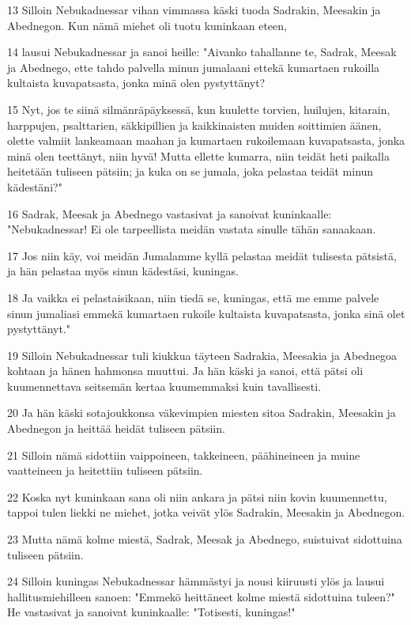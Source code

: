 \par 13 Silloin Nebukadnessar vihan vimmassa käski tuoda Sadrakin, Meesakin ja Abednegon. Kun nämä miehet oli tuotu kuninkaan eteen,
\par 14 lausui Nebukadnessar ja sanoi heille: "Aivanko tahallanne te, Sadrak, Meesak ja Abednego, ette tahdo palvella minun jumalaani ettekä kumartaen rukoilla kultaista kuvapatsasta, jonka minä olen pystyttänyt?
\par 15 Nyt, jos te siinä silmänräpäyksessä, kun kuulette torvien, huilujen, kitarain, harppujen, psalttarien, säkkipillien ja kaikkinaisten muiden soittimien äänen, olette valmiit lankeamaan maahan ja kumartaen rukoilemaan kuvapatsasta, jonka minä olen teettänyt, niin hyvä! Mutta ellette kumarra, niin teidät heti paikalla heitetään tuliseen pätsiin; ja kuka on se jumala, joka pelastaa teidät minun kädestäni?"
\par 16 Sadrak, Meesak ja Abednego vastasivat ja sanoivat kuninkaalle: "Nebukadnessar! Ei ole tarpeellista meidän vastata sinulle tähän sanaakaan.
\par 17 Jos niin käy, voi meidän Jumalamme kyllä pelastaa meidät tulisesta pätsistä, ja hän pelastaa myös sinun kädestäsi, kuningas.
\par 18 Ja vaikka ei pelastaisikaan, niin tiedä se, kuningas, että me emme palvele sinun jumaliasi emmekä kumartaen rukoile kultaista kuvapatsasta, jonka sinä olet pystyttänyt."
\par 19 Silloin Nebukadnessar tuli kiukkua täyteen Sadrakia, Meesakia ja Abednegoa kohtaan ja hänen hahmonsa muuttui. Ja hän käski ja sanoi, että pätsi oli kuumennettava seitsemän kertaa kuumemmaksi kuin tavallisesti.
\par 20 Ja hän käski sotajoukkonsa väkevimpien miesten sitoa Sadrakin, Meesakin ja Abednegon ja heittää heidät tuliseen pätsiin.
\par 21 Silloin nämä sidottiin vaippoineen, takkeineen, päähineineen ja muine vaatteineen ja heitettiin tuliseen pätsiin.
\par 22 Koska nyt kuninkaan sana oli niin ankara ja pätsi niin kovin kuumennettu, tappoi tulen liekki ne miehet, jotka veivät ylös Sadrakin, Meesakin ja Abednegon.
\par 23 Mutta nämä kolme miestä, Sadrak, Meesak ja Abednego, suistuivat sidottuina tuliseen pätsiin.
\par 24 Silloin kuningas Nebukadnessar hämmästyi ja nousi kiiruusti ylös ja lausui hallitusmiehilleen sanoen: "Emmekö heittäneet kolme miestä sidottuina tuleen?" He vastasivat ja sanoivat kuninkaalle: "Totisesti, kuningas!"
